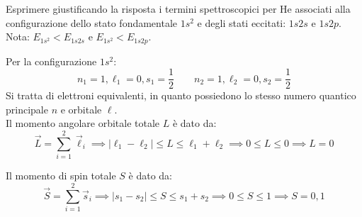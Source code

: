 \begin{exercise}
 
Esprimere giustificando la risposta i termini spettroscopici per He associati alla configurazione dello stato fondamentale \( 1s^2 \) e degli stati eccitati: \( 1s 2s \) e \( 1s 2p \).
Nota: \( E_{1s^2} < E_{1s 2s} \) e  \( E_{1s^2} < E_{1s 2p} \).

\begin{solution}
Per la configurazione \( 1s^2 \):
\begin{equation*}
    n_1 = 1, \ell_1 = 0, s_1 = \frac{1}{2} \qquad n_2 = 1, \ell_2 = 0, s_2 = \frac{1}{2}
\end{equation*}
Si tratta di elettroni equivalenti, in quanto possiedono lo stesso numero quantico principale \( n \) e orbitale \( \ell \).\\
Il momento angolare orbitale totale \( L \) è dato da:
\begin{equation}
    \vec{L} = \sum_{i=1}^{2} \vec{\ell}_i \implies |\ell_1 - \ell_2| \le L \le \ell_1 + \ell_2 \implies 0 \le L \le 0 \implies L = 0
\end{equation}

Il momento di spin totale \( S \) è dato da:
\begin{equation}
    \vec{S} = \sum_{i=1}^{2} \vec{s}_i \implies |s_1 - s_2| \le S \le s_1 + s_2 \implies 0 \le S \le 1 \implies S = 0, 1
\end{equation}


\end{solution}
\end{exercise}
